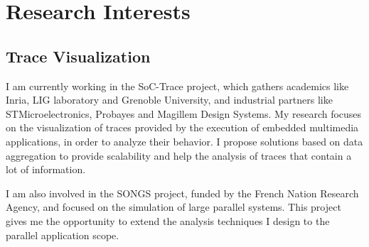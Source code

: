 \section{Research Interests}

\subsection{Trace Visualization}

%
{I am currently working in the SoC-Trace project, which gathers academics like 
Inria, LIG 
laboratory and Grenoble University, and industrial partners like 
STMicroelectronics, Probayes and 
Magillem Design Systems. My research focuses on the visualization of traces 
provided by 
the execution of embedded multimedia applications, in order to analyze their 
behavior. I propose solutions based on data aggregation to provide scalability 
and help the analysis of traces that contain a lot of information.}

%
{I am also involved in the SONGS project, funded by the French 
Nation Research Agency, and focused on the simulation of large parallel 
systems. This project gives me the opportunity to extend the analysis 
techniques I design to the parallel application scope.}